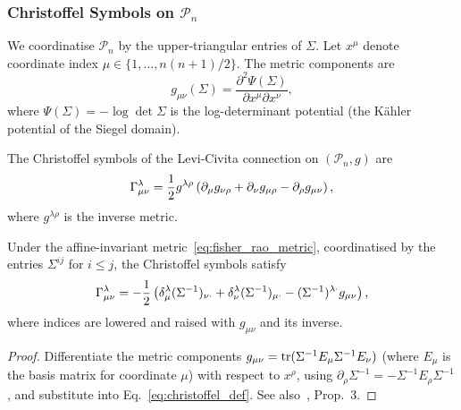 \subsubsection{Christoffel Symbols on $\mathcal{P}_n$}

We coordinatise $\mathcal{P}_n$ by the upper-triangular entries of $\Sigma$.
Let $x^\mu$ denote coordinate index $\mu \in \{1, \ldots, n(n+1)/2\}$.
The metric components are
\begin{equation}
  g_{\mu\nu}(\Sigma) = \frac{\partial^2 \Psi(\Sigma)}{\partial x^\mu \partial x^\nu},
  \label{eq:metric_from_potential}
\end{equation}
where $\Psi(\Sigma) = -\log \det \Sigma$ is the log-determinant potential
(the Kähler potential of the Siegel domain).

The Christoffel symbols of the Levi-Civita connection on $(\mathcal{P}_n, g)$
are
\begin{equation}
  \Gamma^{\lambda}_{\mu \nu}
  = \frac{1}{2} g^{\lambda\rho}
    \left(
      \partial_\mu g_{\nu\rho} + \partial_\nu g_{\mu\rho} - \partial_\rho g_{\mu\nu}
    \right),
  \label{eq:christoffel_def}
\end{equation}
where $g^{\lambda\rho}$ is the inverse metric.

\begin{proposition}
  \label{prop:christoffel}
  Under the affine-invariant metric~\eqref{eq:fisher_rao_metric},
  coordinatised by the entries $\Sigma^{ij}$ for $i \leq j$, the Christoffel
  symbols satisfy
  \begin{equation}
    \Gamma^{\lambda}_{\mu \nu}
    = -\frac{1}{2}\left(
        \delta^\lambda_\mu (\Sigma^{-1})_{\nu\cdot}
      + \delta^\lambda_\nu (\Sigma^{-1})_{\mu\cdot}
      - (\Sigma^{-1})^{\lambda\cdot} g_{\mu\nu}
    \right),
    \label{eq:christoffel_spd}
  \end{equation}
  where indices are lowered and raised with $g_{\mu\nu}$ and its inverse.
\end{proposition}

\begin{proof}
  Differentiate the metric components $g_{\mu\nu} = \operatorname{tr}(\Sigma^{-1}
  E_\mu \Sigma^{-1} E_\nu)$ (where $E_\mu$ is the basis matrix for
  coordinate $\mu$) with respect to $x^\rho$, using
  $\partial_\rho \Sigma^{-1} = -\Sigma^{-1} E_\rho \Sigma^{-1}$, and
  substitute into Eq.~\eqref{eq:christoffel_def}.  See also~\cite{Pennec2006},
  Prop.~3.
\end{proof}


